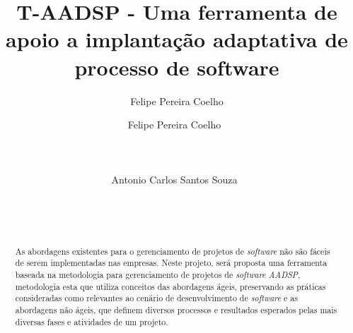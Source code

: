 \documentclass{acm_proc_article-sp}
\author{Felipe Pereira Coelho}
\begin{document}
\title{ T-AADSP - Uma ferramenta de apoio a implantação adaptativa de processo de software}

\author{
%
%
\alignauthor
Felipe Pereira Coelho\ \\
       \\
       \\
       \\
\alignauthor
Antonio Carlos Santos Souza\ \\
       \\
       \\
       \\
}


\maketitle
\begin{abstract}
As abordagens existentes para o gerenciamento de projetos de \textit{software} não são fáceis de serem implementadas nas empresas. Neste projeto, será proposta uma ferramenta baseada na metodologia para gerenciamento de projetos de \textit{software} \textit{AADSP}, metodologia esta que utiliza conceitos das abordagens ágeis, preservando as práticas consideradas como relevantes ao cenário de desenvolvimento de \textit{software} e as abordagens não ágeis, que definem diversos processos e resultados esperados pelas mais diversas fases e atividades de um projeto. 
\end{abstract}

\end{document}
